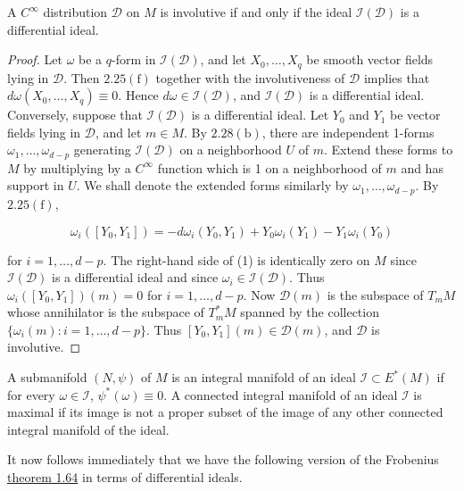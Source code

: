 \begin{proposition}\label{thm:2.30}
A $C^{\infty}$ distribution $\mathcal{D}$ on $M$ is involutive if and only if the ideal $\mathcal{I}(\mathcal{D})$ is a differential ideal.

\end{proposition}

\begin{proof}
Let $\omega$ be a $q$-form in $\mathcal{I}(\mathcal{D})$, and let $X_0, \ldots, X_q$ be smooth vector fields lying in $\mathcal{D}$. Then $2.25(\mathrm{f})$ together with the involutiveness of $\mathcal{D}$ implies that $d\omega(X_0, \ldots, X_q) \equiv 0$. Hence $d\omega \in \mathcal{I}(\mathcal{D})$, and $\mathcal{I}(\mathcal{D})$ is a differential ideal. Conversely, suppose that $\mathcal{I}(\mathcal{D})$ is a differential ideal. Let $Y_0$ and $Y_1$ be vector fields lying in $\mathcal{D}$, and let $m \in M$. By $2.28(\mathrm{b})$, there are independent 1-forms $\omega_1, \ldots, \omega_{d-p}$ generating $\mathcal{I}(\mathcal{D})$ on a neighborhood $U$ of $m$. Extend these forms to $M$ by multiplying by a $C^\infty$ function which is 1 on a neighborhood of $m$ and has support in $U$. We shall denote the extended forms similarly by $\omega_1, \ldots, \omega_{d-p}$. By $2.25(\mathrm{f})$,

\begin{equation}
\tag{1}\label{eq:2.30:1}
\omega_{i}([Y_{0},Y_{1}])=-d\omega_{i}(Y_{0},Y_{1})+Y_{0}\omega_{i}(Y_{1})-Y_{1}\omega_{i}(Y_{0})
\end{equation}

for $i=1,\ldots,d-p$. The right-hand side of (1) is identically zero on $M$ since $\mathcal{I}(\mathcal{D})$ is a differential ideal and since $\omega_i\in\mathcal{I}(\mathcal{D})$. Thus $\omega_i([Y_0,Y_1])(m)=0$ for $i=1,\ldots,d-p$. Now $\mathcal{D}(m)$ is the subspace of $T_{m} M$ whose annihilator is the subspace of $T_{m}^{*} M$ spanned by the collection $\{\omega_i(m):i=1,\ldots,d-p\}$. Thus $[Y_0,Y_1](m)\in\mathcal{D}(m)$, and $\mathcal{D}$ is involutive.

\end{proof}

\begin{definition}\label{thm:2.31}
A submanifold $(N,\psi)$ of $M$ is an integral manifold of an ideal $\mathcal{I} \subset E^{*}(M)$ if for every $\omega \in \mathcal{I}$, $\psi^{*}(\omega) \equiv 0$. A connected integral manifold of an ideal $\mathcal{I}$ is maximal if its image is not a proper subset of the image of any other connected integral manifold of the ideal.

It now follows immediately that we have the following version of the Frobenius \hyperref[thm:1.64]{theorem 1.64} in terms of differential ideals.

\end{definition}

